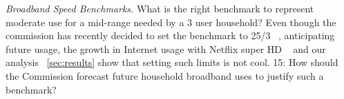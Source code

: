  \emph{Broadband Speed Benchmarks.}  What is the right benchmark to represent moderate use for a mid-range needed by a 3 user household? Even though the commission has recently decided to set the benchmark to 25/3 ~\cite{}, anticipating future usage, the growth in Internet usage with Netflix super HD ~\cite{} and our analysis ~\ref{sec:results} show that setting such limits is not cool. 15: How should the Commission forecast future household broadband uses to justify such a benchmark?

